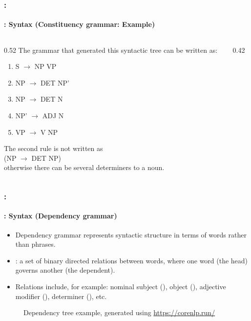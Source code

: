 \documentclass[xcolor=table]{beamer}
\begin{document}
\begin{frame}
	\frametitle{\insertshortsubtitle: \insertsection}
	\framesubtitle{\insertsubsection: Syntax (Constituency grammar: Example)}

	\begin{columns}
		\begin{column}{0.52\textwidth}
		The grammar that generated this syntactic tree can be written as: 
		
		\begin{enumerate}
			\item S $ \rightarrow $ NP VP
			\item NP $ \rightarrow $ DET NP'
			\item NP $ \rightarrow $ DET N
			\item NP' $ \rightarrow $ ADJ N
			\item VP $ \rightarrow $ V NP
		\end{enumerate}
	
		The second rule is not written as \\(NP $ \rightarrow $ DET NP)\\ 
		otherwise there can be several determiners to a noun.
		
		\end{column}
		\begin{column}{0.42\textwidth}
		\end{column}%
	\end{columns}

\end{frame}

\begin{frame}
	\frametitle{\insertshortsubtitle: \insertsection}
	\framesubtitle{\insertsubsection: Syntax (Dependency grammar)}
	
	\begin{itemize}
		\item Dependency grammar represents syntactic structure in terms of words rather than phrases.
		\item {}: a set of binary directed relations between words, where one word (the head) governs another (the dependent).
		\item Relations include, for example: nominal subject (), object (), adjective modifier (), determiner (), etc.
	\end{itemize}
	
	\begin{figure}
		\centering
		\caption{Dependency tree example, generated using \url{https://corenlp.run/}}
	\end{figure}

\end{frame}
\end{document}
